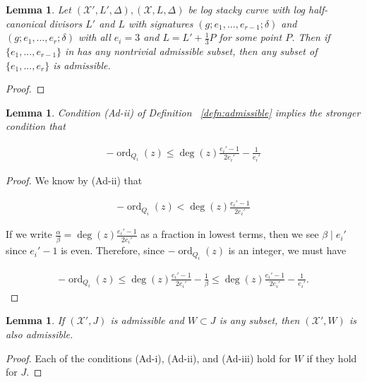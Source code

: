 \documentclass{amsart}
\theoremstyle{plain}
\newtheorem{lem}[thm]{Lemma}
\theoremstyle{definition}
\theoremstyle{remark}
\numberwithin{equation}{section}
\newcommand \sx{\mathscr X}
\DeclareMathOperator{\ord}{ord}
\newcommand \subhalf[1]{\frac{{#1} - 1}{2{#1}}}
\begin{document}
\begin{lem}\label{lem:n-3s-admissible}
Let $(\sx', L', \Delta), (\sx, L,\Delta)$ be log stacky curve with log half-canonical divisors $L'$ and $L$ with signatures $(g; e_1, \ldots, e_{r-1}; \delta)$ and $(g; e_1, \ldots, e_r; \delta)$ with all $e_i=3$ and $L=L'+\frac{1}{3}P$ for some point $P$.  Then if $\{e_1,...,e_{r-1}\}$ in has any nontrivial admissible subset, then any subset of $\{e_1,...,e_r\}$ is admissible.
\end{lem}
\begin{proof}

\end{proof}


\begin{lem}
\label{lem:admissible_inequality}
Condition (Ad-ii) of Definition ~\ref{defn:admissible} implies the
stronger condition that

\begin{align*}
	-\ord_{Q_i}(z) \leq \deg(z) \subhalf{e_i'}-\frac{1}{e_i'}
\end{align*}
\end{lem}

\begin{proof}
We know by (Ad-ii) that

\begin{align*}
	-\ord_{Q_i}(z) < \deg(z) \subhalf{e_i'}
\end{align*}

\noindent
If we write $\frac{\alpha}{\beta} = \deg(z) \frac{e_i'-1}{2e_i'}$ 
as a fraction in lowest terms, then we see $\beta \mid e_i'$ since $
e_i'-1$ is even. Therefore, since $-\ord_{Q_i}(z)$ is an integer, 
we must have

\begin{align*}
	-\ord_{Q_i}(z) \leq \deg(z) \subhalf{e_i'}- \frac{1}{\beta} \leq 
	\deg(z) \subhalf{e_i'}- \frac{1}{e_i'}.
\end{align*}
\end{proof}

\begin{lem}
\label{lem:admissible_subset}
If $(\sx', J)$ is admissible and $W \subset J$ is any subset,
then $(\sx', W)$ is also admissible.
\end{lem}

\begin{proof}
Each of the conditions (Ad-i), (Ad-ii), and (Ad-iii) hold for $W$
if they hold for $J$.
\end{proof}
\end{document}
